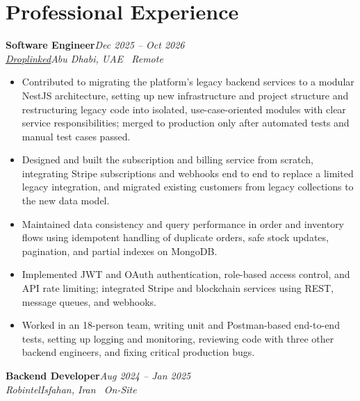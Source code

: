 \documentclass[a4paper,10pt]{article}
\newcommand{\experienceheader}[4]{%
  \noindent\textbf{#1}\hfill\textit{\small\color{medgray}#3}\\[-2pt]
  \textit{\color{medgray}#2}\hfill\textit{\small\color{lightgray}#4}
  \vspace{2pt}
}
\begin{document}
\section{Professional Experience}

\experienceheader
  {Software Engineer}
  {\href{https://droplinked.com/}{Droplinked}}
  {Dec 2025 -- Oct 2026}
  {Abu Dhabi, UAE \textbar\ Remote}

\begin{itemize}
  \item Contributed to migrating the platform's legacy backend services to a modular NestJS architecture, setting up new infrastructure and project structure and restructuring legacy code into isolated, use-case-oriented modules with clear service responsibilities; merged to production only after automated tests and manual test cases passed.
  \item Designed and built the subscription and billing service from scratch, integrating Stripe subscriptions and webhooks end to end to replace a limited legacy integration, and migrated existing customers from legacy collections to the new data model.
  \item Maintained data consistency and query performance in order and inventory flows using idempotent handling of duplicate orders, safe stock updates, pagination, and partial indexes on MongoDB.
  \item Implemented JWT and OAuth authentication, role-based access control, and API rate limiting; integrated Stripe and blockchain services using REST, message queues, and webhooks.
  \item Worked in an 18-person team, writing unit and Postman-based end-to-end tests, setting up logging and monitoring, reviewing code with three other backend engineers, and fixing critical production bugs.
\end{itemize}

\vspace{4pt}

\experienceheader
  {Backend Developer}
  {Robintel}
  {Aug 2024 -- Jan 2025}
  {Isfahan, Iran \textbar\ On-Site}
\end{document}
